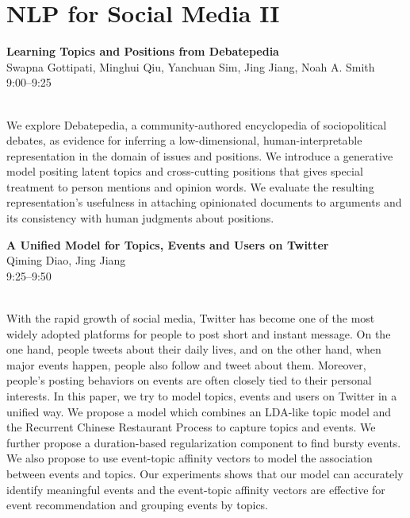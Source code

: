 \documentclass[twoside,makeidx]{book}
\begin{document}
\section{NLP for Social Media II}
\vspace{-1em}
\par\vspace{2em}\noindent%
\begin{minipage}{\linewidth}%
\begin{center}
\textbf{\normalsize Learning Topics and Positions from Debatepedia}\\
\normalsize  Swapna Gottipati,  Minghui Qiu,  Yanchuan Sim,  Jing Jiang,  Noah A. Smith\\
{\small 9:00--9:25}\\
\end{center}
\end{minipage}\\[0.5em]
\nopagebreak%
\noindent%
{\small We explore Debatepedia, a community-authored encyclopedia of sociopolitical debates, as evidence for inferring a low-dimensional, human-interpretable representation in the domain of issues and positions. We introduce a generative model positing latent topics and cross-cutting positions that gives special treatment to person mentions and opinion words. We evaluate the resulting representation's usefulness in attaching opinionated documents to arguments and its consistency with human judgments about positions.}
\par\vspace{2em}\noindent%
\begin{minipage}{\linewidth}%
\begin{center}
\textbf{\normalsize A Unified Model for Topics, Events and Users on Twitter}\\
\normalsize  Qiming Diao,  Jing Jiang\\
{\small 9:25--9:50}\\
\end{center}
\end{minipage}\\[0.5em]
\nopagebreak%
\noindent%
{\small With the rapid growth of social media, Twitter has become one of the most widely adopted platforms for people to post short and instant message. On the one hand, people tweets about their daily lives, and on the other hand, when major events happen, people also follow and tweet about them. Moreover, people's posting behaviors on events are often closely tied to their personal interests. In this paper, we try to model topics, events and users on Twitter in a unified way. We propose a model which combines an LDA-like topic model and the Recurrent Chinese Restaurant Process to capture topics and events. We further propose a duration-based regularization component to find bursty events. We also propose to use event-topic affinity vectors to model the association between events and topics. Our experiments shows that our model can accurately identify meaningful events and the event-topic affinity vectors are effective for event recommendation and grouping events by topics.}
\end{document}
